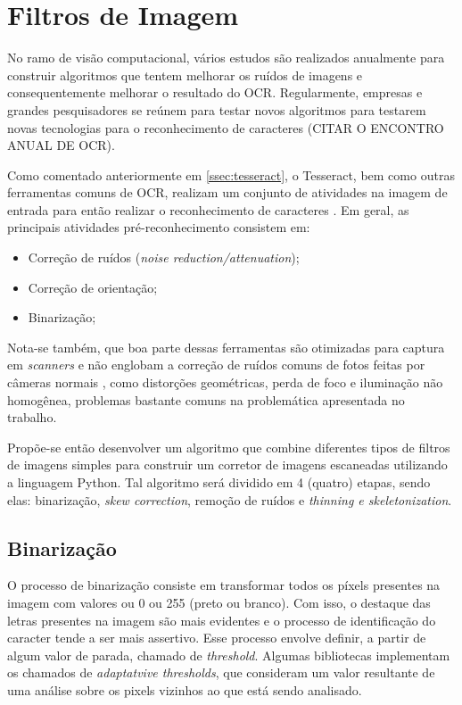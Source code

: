\section{Filtros de Imagem} \label{sec:filtro-de-imagem}
No ramo de visão computacional, vários estudos são realizados anualmente para construir algoritmos que tentem melhorar os ruídos de imagens e consequentemente melhorar o resultado do OCR. Regularmente, empresas e grandes pesquisadores se reúnem para testar novos algoritmos para testarem novas tecnologias para o reconhecimento de caracteres (CITAR O ENCONTRO ANUAL DE OCR).

Como comentado anteriormente em \ref{ssec:tesseract}, o Tesseract, bem como outras ferramentas comuns de OCR, realizam um conjunto de atividades na imagem de entrada para então realizar o reconhecimento de caracteres \cite{image-preprocessing-for-improving-ocr}. Em geral, as principais atividades pré-reconhecimento consistem em:

\begin{itemize}
  \item Correção de ruídos (\textit{noise reduction/attenuation});
  \item Correção de orientação;
  \item Binarização;
\end{itemize}

Nota-se também, que boa parte dessas ferramentas são otimizadas para captura em \textit{scanners} e não englobam a correção de ruídos comuns de fotos feitas por câmeras normais \cite{image-preprocessing-for-improving-ocr}, como distorções geométricas, perda de foco e iluminação não homogênea, problemas bastante comuns na problemática apresentada no trabalho.

Propõe-se então desenvolver um algoritmo que combine diferentes tipos de filtros de imagens simples para construir um corretor de imagens escaneadas utilizando a linguagem Python. Tal algoritmo será dividido em 4 (quatro) etapas, sendo elas: binarização, \textit{skew correction}, remoção de ruídos e \textit{thinning e skeletonization}.

\subsection{Binarização}
O processo de binarização consiste em transformar todos os píxels presentes na imagem com valores ou 0 ou 255 (preto ou branco). Com isso, o destaque das letras presentes na imagem são mais evidentes e o processo de identificação do caracter tende a ser mais assertivo. Esse processo envolve definir, a partir de algum valor de parada, chamado de \textit{threshold}. Algumas bibliotecas implementam os chamados de \textit{adaptatvive thresholds}, que consideram um valor resultante de uma análise sobre os pixels vizinhos ao que está sendo analisado.

